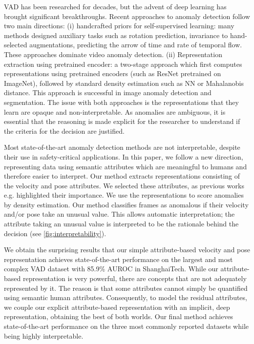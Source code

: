 \documentclass[10pt,twocolumn,letterpaper]{article}
\begin{document}
VAD has been researched for decades, but the advent of deep learning has brought significant breakthroughs. Recent approaches to anomaly detection follow two main directions: (i) handcrafted priors for self-supervised learning: many methods designed auxiliary tasks such as rotation prediction, invariance to hand-selected augmentations, predicting the arrow of time and rate of temporal flow. These approaches dominate video anomaly detection. (ii) Representation extraction using pretrained encoder: a two-stage approach which first computes representations using pretrained encoders (such as ResNet pretrained on ImageNet), followed by standard density estimation such as NN or Mahalanobis distance. This approach is successful in image anomaly detection and segmentation. The issue with both approaches is the representations that they learn are opaque and non-interpretable. As anomalies are ambiguous, it is essential that the reasoning is made explicit for the researcher to understand if the criteria for the decision are justified. 

Most state-of-the-art anomaly detection methods are not interpretable, despite their use in safety-critical applications. In this paper, we follow a new direction, representing data using semantic attributes which are meaningful to humans and therefore easier to interpret. 
Our method extracts representations consisting of the velocity and pose attributes. We selected these attributes, as previous works e.g. \cite{shai_avidan,Georgescu2021AnomalyDI} highlighted their importance. We use the representations to score anomalies by density estimation. Our method classifies frames as anomalous if their velocity and/or pose take an unusual value. This allows automatic interpretation; the attribute taking an unusual value is interpreted to be the rationale behind the decision (see \cref{fig:interpretability}).

We obtain the surprising results that our simple attribute-based velocity and pose representation achieves state-of-the-art performance on the largest and most complex VAD dataset with 85.9\% AUROC in ShanghaiTech. While our attribute-based representation is very powerful, there are concepts that are not adequately represented by it. The reason is that some attributes cannot simply be quantified using semantic human attributes. Consequently, to model the residual attributes, we couple our explicit attribute-based representation with an implicit, deep representation, obtaining the best of both worlds. Our final method achieves state-of-the-art performance on the three most commonly reported datasets while being highly interpretable.
\end{document}
